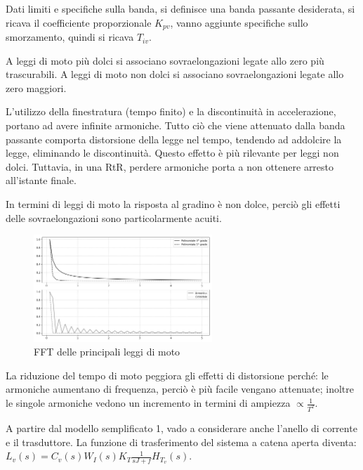 Dati limiti e specifiche sulla banda, si definisce una banda passante desiderata, si ricava il coefficiente proporzionale \(K_{pv}\), vanno aggiunte specifiche sullo smorzamento, quindi si ricava \(T_{iv}\).

A leggi di moto più dolci si associano sovraelongazioni legate allo zero più trascurabili. A leggi di moto non dolci si associano sovraelongazioni legate allo zero maggiori.

L'utilizzo della finestratura (tempo finito) e la discontinuità in accelerazione, portano ad avere infinite armoniche. 
Tutto ciò che viene attenuato dalla banda passante comporta distorsione della legge nel tempo, tendendo ad addolcire la legge, eliminando le discontinuità. Questo effetto è più rilevante per leggi non dolci. Tuttavia, in una RtR, perdere armoniche porta a non ottenere arresto all'istante finale.

In termini di leggi di moto la risposta al gradino è non dolce, perciò gli effetti delle sovraelongazioni sono particolarmente acuiti.

\begin{figure}[h]
    \centering
    \includegraphics[width=0.6\textwidth]{Immagini/fft_leggi_di_moto.png}
    \caption{FFT delle principali leggi di moto}
\end{figure}

La riduzione del tempo di moto peggiora gli effetti di distorsione perché: le armoniche aumentano di frequenza, perciò è più facile vengano attenuate; inoltre le singole armoniche vedono un incremento in termini di ampiezza \(\propto \frac{1}{T^2}\).

A partire dal modello semplificato 1, vado a considerare anche l'anello di corrente e il trasduttore.
La funzione di trasferimento del sistema a catena aperta diventa: \(L_v(s)=C_v(s)W_I(s)K_T \frac{1}{sJ+f}H_{T_v}(s)\).

